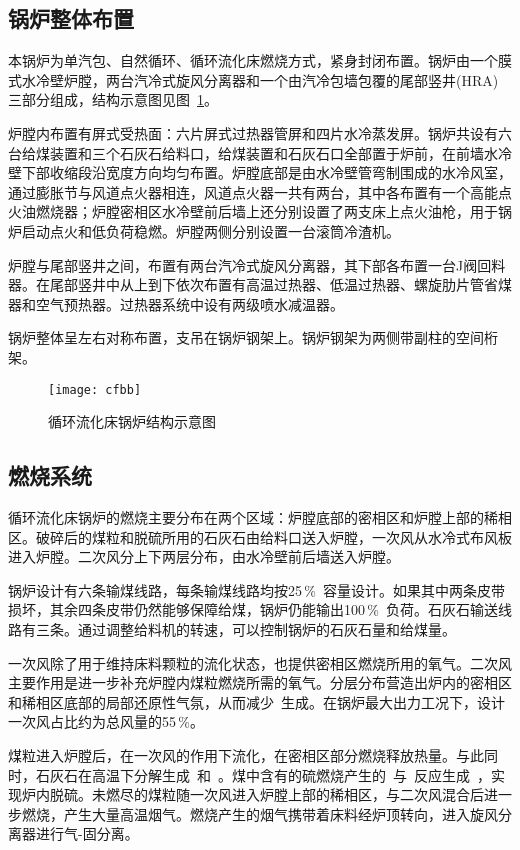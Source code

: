\subsection{锅炉整体布置}

本锅炉为单汽包、自然循环、循环流化床燃烧方式，紧身封闭布置。锅炉由一个膜式水冷壁炉膛，两台汽冷式旋风分离器和一个由汽冷包墙包覆的尾部竖井(HRA)三部分组成，结构示意图见图~\ref{fig:cfbb}。

炉膛内布置有屏式受热面：六片屏式过热器管屏和四片水冷蒸发屏。锅炉共设有六台给煤装置和三个石灰石给料口，给煤装置和石灰石口全部置于炉前，在前墙水冷壁下部收缩段沿宽度方向均匀布置。炉膛底部是由水冷壁管弯制围成的水冷风室，通过膨胀节与风道点火器相连，风道点火器一共有两台，其中各布置有一个高能点火油燃烧器；炉膛密相区水冷壁前后墙上还分别设置了两支床上点火油枪，用于锅炉启动点火和低负荷稳燃。炉膛两侧分别设置一台滚筒冷渣机。

炉膛与尾部竖井之间，布置有两台汽冷式旋风分离器，其下部各布置一台J阀回料器。在尾部竖井中从上到下依次布置有高温过热器、低温过热器、螺旋肋片管省煤器和空气预热器。过热器系统中设有两级喷水减温器。

锅炉整体呈左右对称布置，支吊在锅炉钢架上。锅炉钢架为两侧带副柱的空间桁架。
\begin{figure}[!htb]
\centering
\texttt{[image: cfbb]}
\caption{循环流化床锅炉结构示意图} \label{fig:cfbb}
\end{figure}

\subsection{燃烧系统}

循环流化床锅炉的燃烧主要分布在两个区域：炉膛底部的密相区和炉膛上部的稀相区。破碎后的煤粒和脱硫所用的石灰石由给料口送入炉膛，一次风从水冷式布风板进入炉膛。二次风分上下两层分布，由水冷壁前后墙送入炉膛。

锅炉设计有六条输煤线路，每条输煤线路均按25$\,$\si{\percent}~容量设计。如果其中两条皮带损坏，其余四条皮带仍然能够保障给煤，锅炉仍能输出100$\,$\si{\percent}~负荷。石灰石输送线路有三条。通过调整给料机的转速，可以控制锅炉的石灰石量和给煤量。

一次风除了用于维持床料颗粒的流化状态，也提供密相区燃烧所用的氧气。二次风主要作用是进一步补充炉膛内煤粒燃烧所需的氧气。分层分布营造出炉内的密相区和稀相区底部的局部还原性气氛，从而减少~生成。在锅炉最大出力工况下，设计一次风占比约为总风量的55$\,$\si{\percent}。

煤粒进入炉膛后，在一次风的作用下流化，在密相区部分燃烧释放热量。与此同时，石灰石在高温下分解生成~和~。煤中含有的硫燃烧产生的~与~反应生成~，实现炉内脱硫。未燃尽的煤粒随一次风进入炉膛上部的稀相区，与二次风混合后进一步燃烧，产生大量高温烟气。燃烧产生的烟气携带着床料经炉顶转向，进入旋风分离器进行气-固分离。

